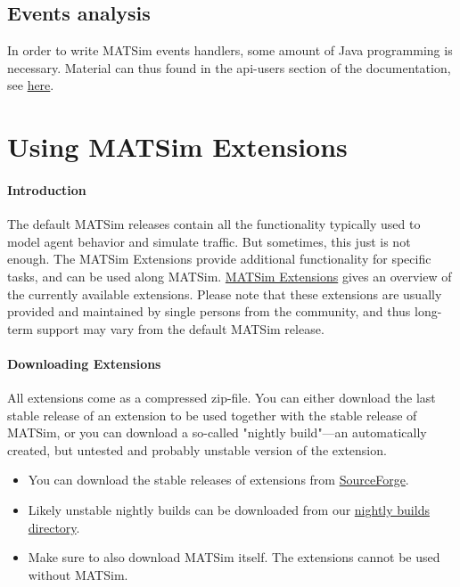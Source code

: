 \documentclass[a4paper,11pt]{report}
\begin{document}
\vfill\eject
\section{Events analysis}

In  order to write MATSim events handlers, some amount of Java programming  is necessary. Material can thus found in the api-users section of  the documentation, see \href{http://www.matsim.org/node/17}{here}.

\chapter{Using MATSim Extensions}

\subsubsection{Introduction}

The default MATSim releases contain all the functionality typically  used to model agent behavior and simulate traffic. But sometimes, this  just is not enough. The MATSim Extensions provide additional  functionality for specific tasks, and can be used along MATSim. \href{http://www.matsim.org/extensions}{MATSim Extensions}  gives an overview of the currently available extensions. Please note  that these extensions are usually provided and maintained by single  persons from the community, and thus long-term support may vary from the  default MATSim release.

\subsubsection{Downloading Extensions}

All extensions come as a compressed zip-file. You can either download  the last stable release of an extension to be used together with the  stable release of MATSim, or you can download a so-called "nightly  build"—an automatically created, but untested and probably unstable  version of the extension.
\begin{itemize}
	\item You can download the stable releases of extensions from \href{http://sourceforge.net/projects/matsim/files/MATSim/}{SourceForge}.
	\item Likely unstable nightly builds can be downloaded from our \href{http://matsim.org/files/builds/}{nightly builds directory}.
	\item Make sure to also download MATSim itself. The extensions cannot be used without MATSim.
\end{itemize}
\end{document}
